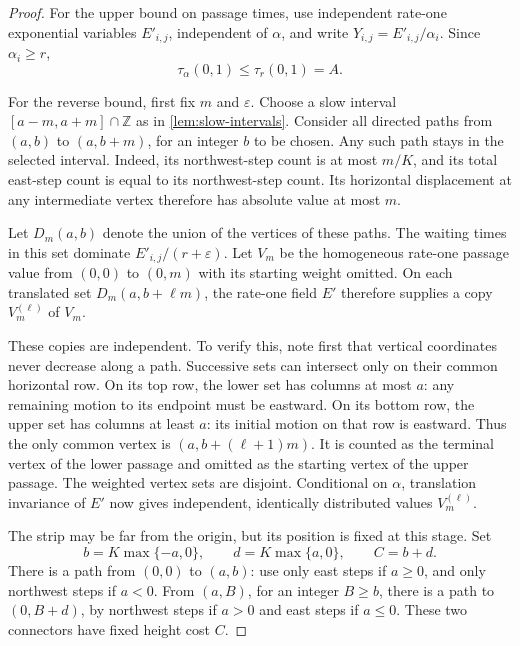 \documentclass[11pt]{amsart}
\theoremstyle{remark}
\newcommand{\ZZ}{\mathbb Z}
\numberwithin{equation}{section}
\begin{document}
\begin{proof}
For the upper bound on passage times, use independent rate-one
exponential variables $E'_{i,j}$, independent of $\alpha$, and write
$Y_{i,j}=E'_{i,j}/\alpha_i$. Since $\alpha_i\geq r$,
\begin{equation}\label{eq:capacity-upper}
 \tau_\alpha(0,1)\leq\tau_r(0,1)=A.
\end{equation}

For the reverse bound, first fix $m$ and $\varepsilon$. Choose a slow
interval $[a-m,a+m]\cap\ZZ$ as in \cref{lem:slow-intervals}.
Consider all directed paths from $(a,b)$ to $(a,b+m)$, for an integer
$b$ to be chosen. Any such path stays in the selected interval.
Indeed, its northwest-step count is at most $m/K$, and its total
east-step count is equal to its northwest-step count. Its horizontal
displacement at any intermediate vertex therefore has absolute value
at most $m$.

Let $D_m(a,b)$ denote the union of the vertices of these paths.
The waiting times in this set dominate $E'_{i,j}/(r+\varepsilon)$.
Let $V_m$ be the homogeneous rate-one passage value from $(0,0)$ to
$(0,m)$ with its starting weight omitted. On each translated set
$D_m(a,b+\ell m)$, the rate-one field $E'$ therefore supplies a copy
$V_m^{(\ell)}$ of $V_m$.

These copies are independent. To verify this, note first that vertical
coordinates never decrease along a path. Successive sets can intersect
only on their common horizontal row. On its top row, the lower set
has columns at most $a$: any remaining motion to its endpoint must
be eastward. On its bottom row, the upper set has columns at least
$a$: its initial motion on that row is eastward. Thus the only common
vertex is $(a,b+(\ell+1)m)$. It is counted as the terminal vertex of
the lower passage and omitted as the starting vertex of the upper
passage. The weighted vertex sets are disjoint. Conditional on
$\alpha$, translation invariance of $E'$ now gives independent,
identically distributed values $V_m^{(\ell)}$.

The strip may be far from the origin, but its position is fixed at
this stage. Set
\[
 b=K\max\{-a,0\},\qquad d=K\max\{a,0\},\qquad C=b+d.
\]
There is a path from $(0,0)$ to $(a,b)$: use only east steps if
$a\geq0$, and only northwest steps if $a<0$. From $(a,B)$, for an
integer $B\geq b$, there is
a path to $(0,B+d)$, by northwest steps if $a>0$ and east steps if
$a\leq0$. These two connectors have fixed height cost $C$.


\end{proof}
\end{document}

